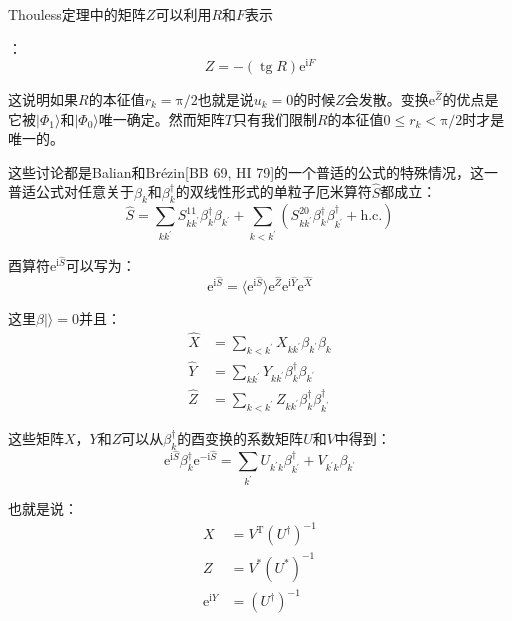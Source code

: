 Thouless定理中的矩阵$Z$可以利用$R$和$F$表示

：
\[
Z=-(\mathop{\text{tg}}R)\mathrm{e}^{\mathrm{i}F}
\]

这说明如果$R$的本征值$r_{k}=\mathrm{\pi}/2$也就是说$u_{k}=0$的时候$Z$会发散。变换$\mathrm{e}^{\hat{Z}}$的优点是它被$|\Phi_{1}\rangle$和$|\Phi_{0}\rangle$唯一确定。然而矩阵$T$只有我们限制$R$的本征值$0\leq r_{k}<\mathrm{\pi}/2$时才是唯一的。

这些讨论都是Balian和Brézin{[}BB 69, HI 79{]}的一个普适的公式的特殊情况，这一普适公式对任意关于$\beta_{k}$和$\beta^{\dagger}_{k}$的双线性形式的单粒子厄米算符$\hat{S}$都成立：
\[
\hat{S}=\sum_{kk^{\prime}}S^{11}_{kk^{\prime}}\beta^{\dagger}_{k}\beta_{k^{\prime}}+\sum_{k<k^{\prime}}(S^{20}_{kk^{\prime}}\beta^{\dagger}_{k}\beta^{\dagger}_{k^{\prime}}+\text{h.c.})
\]

酉算符$\mathrm{e}^{\mathrm{i}\hat{S}}$可以写为：
\[
\mathrm{e}^{\mathrm{i}\hat{S}}=\langle\mathrm{e}^{\mathrm{i}\hat{S}}\rangle\mathrm{e}^{\hat{Z}}\mathrm{e}^{\mathrm{i}\hat{Y}}\mathrm{e}^{\hat{X}}
\]

这里$\beta|\rangle=0$并且：
\begin{align*}
\hat{X} & =\sum_{k<k^{\prime}}X_{kk^{\prime}}\beta_{k^{\prime}}\beta_{k}\\
\hat{Y} & =\sum_{kk^{\prime}}Y_{kk^{\prime}}\beta^{\dagger}_{k}\beta_{k^{\prime}}\\
\hat{Z} & =\sum_{k<k^{\prime}}Z_{kk^{\prime}}\beta^{\dagger}_{k}\beta^{\dagger}_{k^{\prime}}
\end{align*}

这些矩阵$X$，$Y$和$Z$可以从$\beta^{\dagger}_{k}$的酉变换的系数矩阵$U$和$V$中得到：
\[
\mathrm{e}^{\mathrm{i}\hat{S}}\beta^{\dagger}_{k}\mathrm{e}^{-\mathrm{i}\hat{S}}=\sum_{k^{\prime}}U_{k^{\prime}k}\beta^{\dagger}_{k^{\prime}}+V_{k^{\prime}k}\beta_{k^{\prime}}
\]

也就是说：
\begin{align*}
X & =V^{\mathrm{T}}(U^{\dagger})^{-1}\\
Z & =V^{*}(U^{*})^{-1}\\
\mathrm{e}^{\mathrm{i}Y} & =(U^{\dagger})^{-1}
\end{align*}

